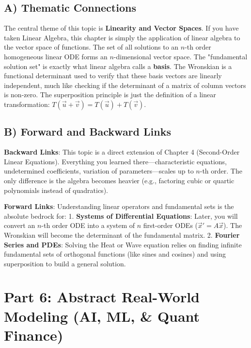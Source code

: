 \documentclass[11pt,letterpaper]{article}
\begin{document}
\subsection{A) Thematic Connections}
The central theme of this topic is \textbf{Linearity and Vector Spaces}. If you have taken Linear Algebra, this chapter is simply the application of linear algebra to the vector space of functions. 
The set of all solutions to an $n$-th order homogeneous linear ODE forms an $n$-dimensional vector space. The "fundamental solution set" is exactly what linear algebra calls a \textbf{basis}. The Wronskian is a functional determinant used to verify that these basis vectors are linearly independent, much like checking if the determinant of a matrix of column vectors is non-zero. The superposition principle is just the definition of a linear transformation: $T(\vec{u} + \vec{v}) = T(\vec{u}) + T(\vec{v})$.

\subsection{B) Forward and Backward Links}
\textbf{Backward Links}: This topic is a direct extension of Chapter 4 (Second-Order Linear Equations). Everything you learned there—characteristic equations, undetermined coefficients, variation of parameters—scales up to $n$-th order. The only difference is the algebra becomes heavier (e.g., factoring cubic or quartic polynomials instead of quadratics).

\textbf{Forward Links}: Understanding linear operators and fundamental sets is the absolute bedrock for:
1. \textbf{Systems of Differential Equations}: Later, you will convert an $n$-th order ODE into a system of $n$ first-order ODEs ($\vec{x}' = A\vec{x}$). The Wronskian will become the determinant of the fundamental matrix.
2. \textbf{Fourier Series and PDEs}: Solving the Heat or Wave equation relies on finding infinite fundamental sets of orthogonal functions (like sines and cosines) and using superposition to build a general solution.

\newpage
\section{Part 6: Abstract Real-World Modeling (AI, ML, \& Quant Finance)}
\end{document}
